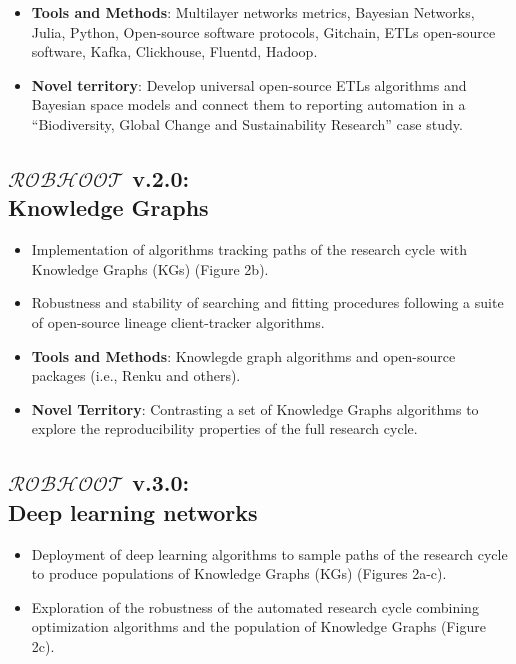 \documentclass[10pt, a4paper, twocolumn]{article} %
\begin{document}
{   \begin{itemize}
   \item {\bf Tools and Methods}: Multilayer networks metrics,
     Bayesian Networks, Julia, Python, Open-source software protocols,
     Gitchain, ETLs open-source software, Kafka, Clickhouse, Fluentd,
     Hadoop.
   \end{itemize}

    \begin{itemize}
    \item {\bf Novel territory}: Develop universal open-source ETLs
      algorithms and Bayesian space models and connect them to
      reporting automation in a ``Biodiversity, Global Change and
      Sustainability Research'' case study.
   \end{itemize}

   
   
  \subsection{{\bf $\mathcal{ROBHOOT}$ v.2.0}: \\ Knowledge Graphs}
  \begin{itemize}
  \item Implementation of algorithms tracking paths of the research
    cycle with Knowledge Graphs (KGs) (Figure 2b).
  \item Robustness and stability of searching and fitting procedures
    following a suite of open-source lineage client-tracker
    algorithms.
  \end{itemize}

   \begin{itemize}
   \item {\bf Tools and Methods}: Knowlegde graph algorithms and
     open-source packages (i.e., Renku and others).
   \end{itemize}

    \begin{itemize}
    \item {\bf Novel Territory}: Contrasting a set of Knowledge Graphs
      algorithms to explore the reproducibility properties of the full
      research cycle.
   \end{itemize}

  
  \subsection{{\bf $\mathcal{ROBHOOT}$ v.3.0}: \\ Deep learning networks}
  \begin{itemize}
  \item Deployment of deep learning algorithms to sample paths of the
    research cycle to produce populations of Knowledge Graphs (KGs)
    (Figures 2a-c).
  \item Exploration of the robustness of the automated research cycle
    combining optimization algorithms and the population of Knowledge
    Graphs (Figure 2c).
  \end{itemize}

}
\end{document}
